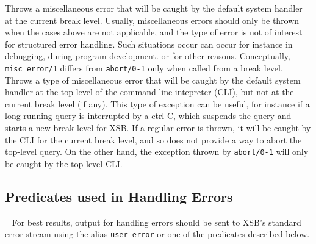 \begin{description}
%
Throws a miscellaneous error that will be caught by the default system
handler at the current break level.  Usually, miscellaneous errors
should only be thrown when the cases above are not applicable, and the
type of error is not of interest for structured error handling.  Such
situations occur can occur for instance in debugging, during program
development. or for other reasons.  Conceptually, {\tt misc\_error/1}
differs from {\tt abort/0-1} only when called from a break level.
%
%
Throws a type of miscellaneous error that will be caught by the
default system handler at the top level of the command-line intepreter
(CLI), but not at the current break level (if any).  This type of
exception can be useful, for instance if a long-running query is
interrupted by a ctrl-C, which suspends the query and starts a new
break level for XSB.  If a regular error is thrown, it will be caught
by the CLI for the current break level, and so does not provide a way
to abort the top-level query.  On the other hand, the exception thrown
by {\tt abort/0-1} will only be caught by the top-level CLI.  
%
\end{description}
%
%
%
%

\subsection{Predicates used in Handling Errors}~\label{sec:catch}
%
For best results, output for handling errors should be sent to XSB's
standard error stream using the alias {\tt user\_error} or one of the
predicates described below.

